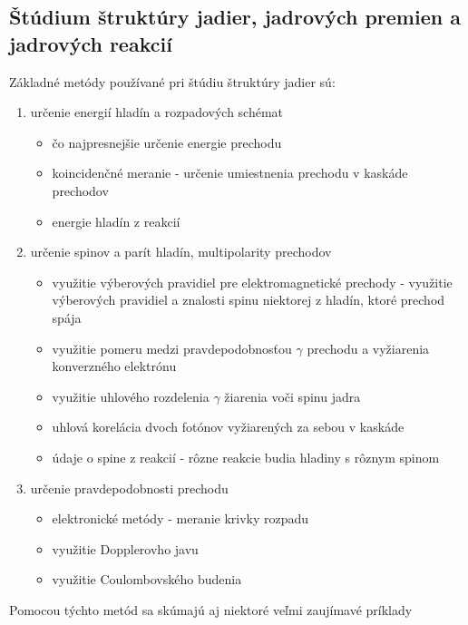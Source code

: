 \documentclass[../../main.tex]{subfiles}
\begin{document}
\subsection{Štúdium štruktúry jadier, jadrových premien a jadrových reakcií}

Základné metódy používané pri štúdiu štruktúry jadier sú:
\begin{enumerate}
\item určenie energií hladín a rozpadových schémat

\begin{itemize}
\item čo najpresnejšie určenie energie prechodu
\item koincidenčné meranie - určenie umiestnenia prechodu v kaskáde prechodov
\item energie hladín z reakcií
\end{itemize}

\item určenie spinov a parít hladín, multipolarity prechodov
\begin{itemize}
\item využitie výberových pravidiel pre elektromagnetické prechody - využitie výberových pravidiel a znalosti spinu niektorej z hladín, ktoré prechod spája
\item využitie pomeru medzi pravdepodobnosťou $\gamma$ prechodu a vyžiarenia konverzného elektrónu
\item využitie uhlového rozdelenia $\gamma$ žiarenia voči spinu jadra
\item uhlová korelácia dvoch fotónov vyžiarených za sebou v kaskáde
\item údaje o spine z reakcií - rôzne reakcie budia hladiny s rôznym spinom 
\end{itemize}

\item určenie pravdepodobnosti prechodu

\begin{itemize}
\item elektronické metódy - meranie krivky rozpadu
\item využitie Dopplerovho javu
\item využitie Coulombovského budenia
\end{itemize}
\end{enumerate}

Pomocou týchto metód sa skúmajú aj niektoré veľmi zaujímavé príklady
\end{document}
